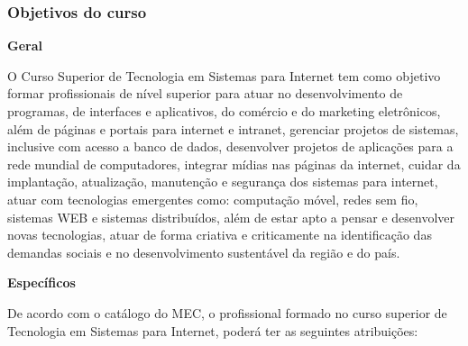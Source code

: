 
\subsubsection{Objetivos do curso}

\textbf{Geral}

\vspace{5mm}

O Curso Superior de Tecnologia em Sistemas para Internet tem como objetivo formar profissionais de nível superior para atuar no desenvolvimento de programas, de interfaces e aplicativos, do comércio e do marketing eletrônicos, além de páginas e portais para internet e intranet, gerenciar projetos de sistemas, inclusive com acesso a banco de dados, desenvolver projetos de aplicações para a rede mundial de computadores, integrar mídias nas páginas da internet, cuidar da implantação, atualização, manutenção e segurança dos sistemas para internet, atuar com tecnologias emergentes como: computação móvel, redes sem fio, sistemas WEB e sistemas distribuídos, além de estar apto a pensar e desenvolver novas tecnologias, atuar de forma criativa e criticamente na identificação das demandas sociais e no desenvolvimento sustentável da região e do país.

\vspace{5mm}
\textbf{Específicos}

\vspace{5mm}

De acordo com o cat\'alogo do MEC, o profissional formado no curso superior de Tecnologia em Sistemas para Internet, poder\'a ter as seguintes atribui\c{c}\~oes:

